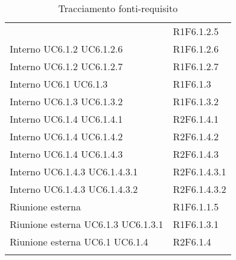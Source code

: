 \begin{longtable}{p{2.5cm}!{\VRule[1pt]}p{2.5cm}}
 & R1F6.1.2.5 \\
Interno \newline UC6.1.2
 \newline UC6.1.2.6
 & R1F6.1.2.6 \\
Interno \newline UC6.1.2
 \newline UC6.1.2.7
 & R1F6.1.2.7 \\
Interno \newline UC6.1
 \newline UC6.1.3
 & R1F6.1.3 \\
Interno \newline UC6.1.3
 \newline UC6.1.3.2
 & R1F6.1.3.2 \\
Interno \newline UC6.1.4
 \newline UC6.1.4.1
 & R2F6.1.4.1 \\
Interno \newline UC6.1.4
 \newline UC6.1.4.2
 & R2F6.1.4.2 \\
Interno \newline UC6.1.4
 \newline UC6.1.4.3
 & R2F6.1.4.3 \\
Interno \newline UC6.1.4.3
 \newline UC6.1.4.3.1
 & R2F6.1.4.3.1 \\
Interno \newline UC6.1.4.3
 \newline UC6.1.4.3.2
 & R2F6.1.4.3.2 \\
Riunione esterna & R1F6.1.1.5 \\
Riunione esterna \newline UC6.1.3
 \newline UC6.1.3.1
 & R1F6.1.3.1 \\
Riunione esterna \newline UC6.1
 \newline UC6.1.4
 & R2F6.1.4 \\
\caption{Tracciamento fonti-requisito}
\end{longtable}